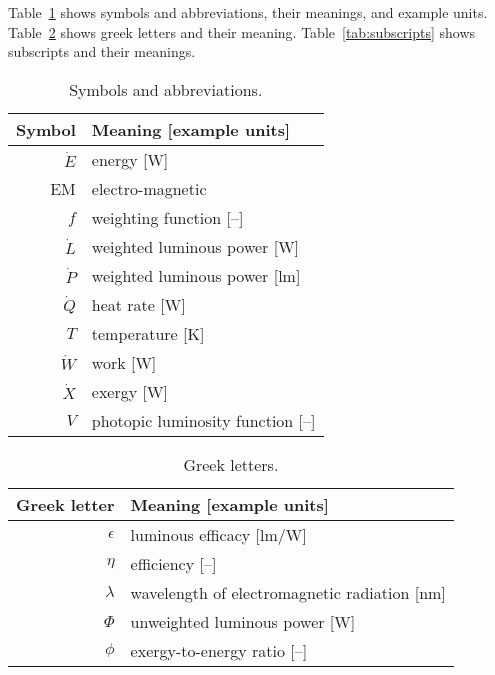 
\noindent 
Table~\ref{tab:symbols} shows symbols and abbreviations, their meanings, and example units.
Table~\ref{tab:greek} shows greek letters and their meaning.
Table~\ref{tab:subscripts} shows subscripts and their meanings.


  
\begin{table}
\centering %
\caption{Symbols and abbreviations.}
\begin{tabular}{r l}
\toprule
Symbol & Meaning [example units] \\
\midrule
$\dot{E}$ & energy [W] \\
EM & electro-magnetic \\
$f$ & weighting function [--] \\
$\dot{L}$ & weighted luminous power [W] \\
$\dot{P}$ & weighted luminous power [lm] \\
$\dot{Q}$ & heat rate [W] \\
$T$ & temperature [K] \\
$\dot{W}$ & work [W] \\
$\dot{X}$ & exergy [W] \\
$V$ & photopic luminosity function [--] \\
\bottomrule
\end{tabular}
\label{tab:symbols}
\end{table}



\begin{table}
\centering %
\caption{Greek letters.}
\begin{tabular}{r l}
  \toprule
  Greek letter & Meaning [example units] \\
  \midrule
  $\epsilon$ & luminous efficacy [lm/W] \\
  $\eta$ & efficiency [--] \\
  $\lambda$ & wavelength of electromagnetic radiation [nm] \\
  $\Phi$ & unweighted luminous power [W] \\
  $\phi$ & exergy-to-energy ratio [--] \\
  \bottomrule
\end{tabular}
\label{tab:greek}
\end{table}


